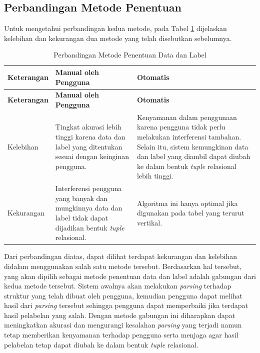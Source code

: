 	\subsection{Perbandingan Metode Penentuan}
	Untuk mengetahui perbandingan kedua metode, pada Tabel \ref{MetodePenentuan} dijelaskan kelebihan dan kekurangan dua metode yang telah disebutkan sebelumnya.
	\begin{small}
	\begin{longtable}{ | p{3cm} | p{4cm} | p{4cm} | }
	    \caption{Perbandingan Metode Penentuan Data dan Label}
	    \label{MetodePenentuan}\\ \hline
	    \centering\bfseries{Keterangan} & \centering\bfseries{Manual oleh Pengguna} & \centering\bfseries{Otomatis} \tabularnewline \hline
	    \endfirsthead
	    \hline
	    \centering\bfseries{Keterangan} & \centering\bfseries{Manual oleh Pengguna} & \centering\bfseries{Otomatis} \tabularnewline \hline
	    \endhead
	    Kelebihan & Tingkat akurasi lebih tinggi karena data dan label yang ditentukan sesuai dengan keinginan pengguna. & Kenyamanan dalam penggunaan karena pengguna tidak perlu melakukan interferensi tambahan. Selain itu, sistem kemungkinan data dan label yang diambil dapat diubah ke dalam bentuk \textit{tuple} relasional lebih tinggi. \\ \hline
	    Kekurangan & Interferensi pengguna yang banyak dan mungkinnya data dan label tidak dapat dijadikan bentuk \textit{tuple} relasional. & Algoritma ini hanya optimal jika digunakan pada tabel yang terurut vertikal. \\ \hline
  	\end{longtable}
	\end{small}
  	Dari perbandingan diatas, dapat dilihat terdapat kekurangan dan kelebihan didalam menggunakan salah satu metode tersebut. Berdasarkan hal tersebut, yang akan dipilih sebagai metode penentuan data dan label adalah gabungan dari kedua metode tersebut. Sistem awalnya akan melakukan \textit{parsing} terhadap struktur yang telah dibuat oleh pengguna, kemudian pengguna dapat melihat hasil dari \textit{parsing} tersebut sehingga pengguna dapat memperbaiki jika terdapat hasil pelabelan yang salah. Dengan metode gabungan ini diharapkan dapat meningkatkan akurasi dan mengurangi kesalahan \textit{parsing} yang terjadi namun tetap memberikan kenyamanan terhadap pengguna serta menjaga agar hasil pelabelan tetap dapat diubah ke dalam bentuk \textit{tuple} relasional.

